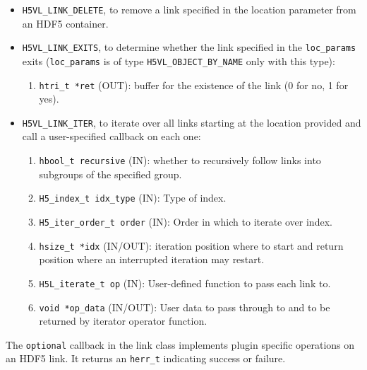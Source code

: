 \begin{itemize}
\item \texttt{H5VL\_LINK\_DELETE}, to remove a link specified in the location parameter from an HDF5 container.

\item \texttt{H5VL\_LINK\_EXITS}, to determine whether the link specified
  in the \texttt{loc\_params} exits (\texttt{loc\_params} is of type \texttt{H5VL\_OBJECT\_BY\_NAME} only with this type):
  \begin{enumerate}
  \item \texttt{htri\_t *ret} (OUT): buffer for the existence of the link
    (0 for no, 1 for yes).
  \end{enumerate}

\item \texttt{H5VL\_LINK\_ITER}, to iterate over all links starting at the location provided and call a user-specified callback on each one:
  \begin{enumerate}
  \item \texttt{hbool\_t recursive} (IN): whether to recursively follow links into subgroups of the specified group.\\
  \item \texttt{H5\_index\_t idx\_type} (IN): Type of index.\\
  \item \texttt{H5\_iter\_order\_t order} (IN): Order in which to iterate over index.\\
  \item \texttt{hsize\_t *idx} (IN/OUT):  iteration position where to start and return position where an interrupted iteration may restart.\\
  \item \texttt{H5L\_iterate\_t op} (IN): User-defined function to pass each link to. \\
  \item \texttt{void *op\_data} (IN/OUT): User data to pass through to and to be returned by iterator operator function. \\
  \end{enumerate}
\end{itemize}

The \texttt{optional} callback in the link class implements plugin specific operations on an HDF5 link. It returns an \texttt{herr\_t} indicating success or failure.\bigskip 

